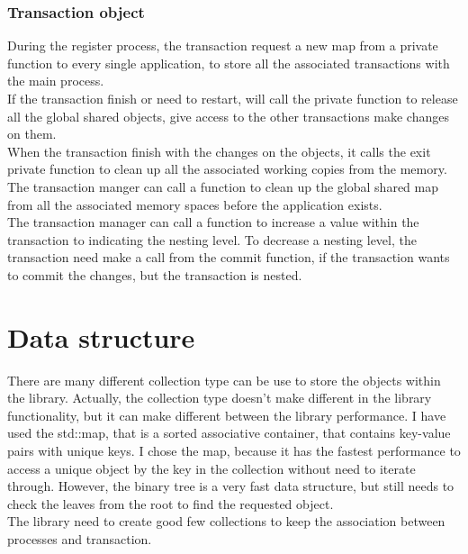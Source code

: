 \documentclass[12pt]{article}
\begin{document}
\subsubsection{Transaction object}
During the register process, the transaction request a new map from a private function to every single application, to store all the associated transactions with the main process.\\
If the transaction finish or need to restart, will call the private function to release all the global shared objects, give access to the other transactions make changes on them.\\ 
When the transaction finish with the changes on the objects, it calls the exit private function to clean up all the associated working copies from the memory.\\

The transaction manger can  call a function to clean up the global shared map from all the associated memory spaces before the application exists.\\

The transaction manager can call a function to increase a value within the transaction to indicating the nesting level. To decrease a nesting level, the transaction need make a call from the commit function, if the transaction wants to commit the changes, but the transaction is nested.

\section{Data structure}
There are many different collection type can be use to store the objects within the library. Actually, the collection type doesn't make different in the library functionality, but it can make different between the library performance. I have used the std::map, that is a sorted associative container, that contains key-value pairs with unique keys. I chose the map, because it has the fastest performance to access a unique object by the key in the collection without need to iterate through. However, the binary tree is a very fast data structure, but still needs to check the leaves from the root to find the requested object.\\

The library need to create good few collections to keep the association between processes and transaction.
\end{document}
